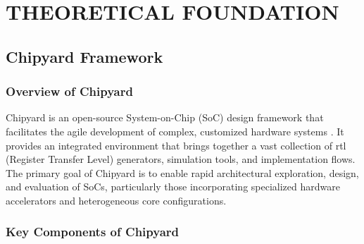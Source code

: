 \chapter{THEORETICAL FOUNDATION} %
\label{Chapter2}

\section{Chipyard Framework}
\label{sec:chipyard}

\subsection{Overview of Chipyard}
\label{sec:chipyard_overview}

Chipyard is an open-source System-on-Chip (SoC) design framework that facilitates the agile development of complex, customized hardware systems \cite{chipyard}. It provides an integrated environment that brings together a vast collection of \gls{rtl} (Register Transfer Level) generators, simulation tools, and implementation flows. The primary goal of Chipyard is to enable rapid architectural exploration, design, and evaluation of SoCs, particularly those incorporating specialized hardware accelerators and heterogeneous core configurations.

\subsection{Key Components of Chipyard}
\label{sec:chipyard_key_components}


